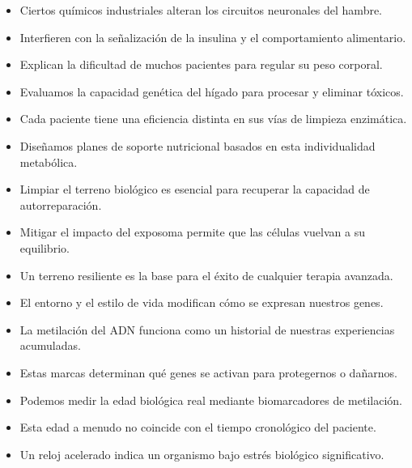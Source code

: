 \begin{itemize}
    \item Ciertos químicos industriales alteran los circuitos neuronales del hambre.
    \item Interfieren con la señalización de la insulina y el comportamiento alimentario.
    \item Explican la dificultad de muchos pacientes para regular su peso corporal.
\end{itemize}

\begin{itemize}
    \item Evaluamos la capacidad genética del hígado para procesar y eliminar tóxicos.
    \item Cada paciente tiene una eficiencia distinta en sus vías de limpieza enzimática.
    \item Diseñamos planes de soporte nutricional basados en esta individualidad metabólica.
\end{itemize}

\begin{itemize}
    \item Limpiar el terreno biológico es esencial para recuperar la capacidad de autorreparación.
    \item Mitigar el impacto del exposoma permite que las células vuelvan a su equilibrio.
    \item Un terreno resiliente es la base para el éxito de cualquier terapia avanzada.
\end{itemize}

\begin{itemize}
    \item El entorno y el estilo de vida modifican cómo se expresan nuestros genes.
    \item La metilación del ADN funciona como un historial de nuestras experiencias acumuladas.
    \item Estas marcas determinan qué genes se activan para protegernos o dañarnos.
\end{itemize}

\begin{itemize}
    \item Podemos medir la edad biológica real mediante biomarcadores de metilación.
    \item Esta edad a menudo no coincide con el tiempo cronológico del paciente.
    \item Un reloj acelerado indica un organismo bajo estrés biológico significativo.
\end{itemize}

